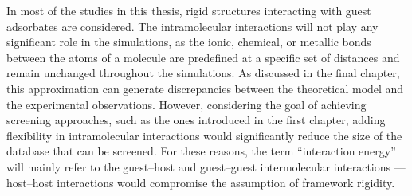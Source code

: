 \documentclass[main.tex]{subfiles}
\begin{document}
In most of the studies in this thesis, rigid structures interacting with guest adsorbates are considered. The intramolecular interactions will not play any significant role in the simulations, as the ionic, chemical, or metallic bonds between the atoms of a molecule are predefined at a specific set of distances and remain unchanged throughout the simulations. As discussed in the final chapter, this approximation can generate discrepancies between the theoretical model and the experimental observations. However, considering the goal of achieving screening approaches, such as the ones introduced in the first chapter, adding flexibility in intramolecular interactions would significantly reduce the size of the database that can be screened. For these reasons, the term ``interaction energy'' will mainly refer to the guest--host and guest--guest intermolecular interactions --- host--host interactions would compromise the assumption of framework rigidity.
\end{document}

